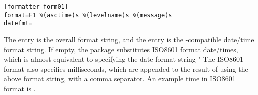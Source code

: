 \begin{verbatim}
[formatter_form01]
format=F1 %(asctime)s %(levelname)s %(message)s
datefmt=
\end{verbatim}

The  entry is the overall format string, and the
 entry is the -compatible date/time format
string. If empty, the package substitutes ISO8601 format date/times, which
is almost equivalent to specifying the date format string "%
The ISO8601 format also specifies milliseconds, which are appended to the
result of using the above format string, with a comma separator. An example
time in ISO8601 format is .
